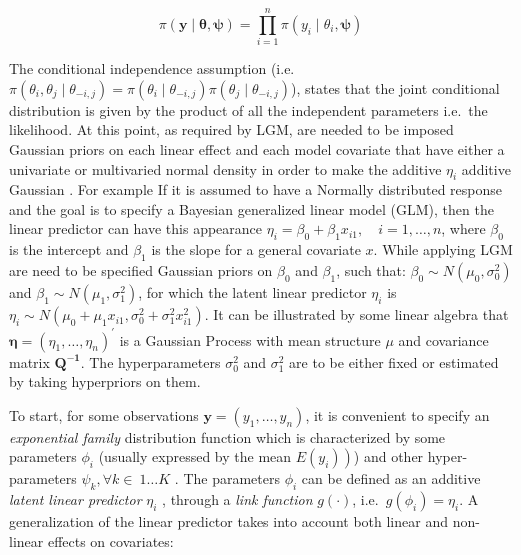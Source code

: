 \documentclass[
  12pt,
  a4paper,
  oneside]{book}
\theoremstyle{definition}
\theoremstyle{definition}
\theoremstyle{definition}
\theoremstyle{remark}
\begin{document}
\[
\pi(\boldsymbol{\mathbf{y}} \mid \boldsymbol{\theta}, \boldsymbol{\psi})=\prod_{i=1}^{n} \pi\left(y_{i} \mid \theta_{i}, \boldsymbol{\psi}\right)
\]

The conditional independence assumption \citep{GMRFRue} (i.e.~\(\pi\left(\theta_{i}, \theta_{j} \mid \theta_{-i, j}\right)=\pi\left(\theta_{i} \mid \theta_{-i, j}\right) \pi\left(\theta_{j} \mid \theta_{-i, j}\right)\)), states that the joint conditional distribution is given by the product of all the independent parameters i.e.~the likelihood.
At this point, as required by LGM, are needed to be imposed Gaussian priors on each linear effect and each model covariate that have either a univariate or multivaried normal density in order to make the additive \(\eta_i\) additive Gaussian \citeyearpar{wang2018bayesian}.
For example If it is assumed to have a Normally distributed response and the goal is to specify a Bayesian generalized linear model (GLM), then the linear predictor can have this appearance \(\eta_{i}=\beta_{0}+\beta_{1} x_{i 1}, \quad i=1, \ldots, n\), where \(\beta_{0}\) is the intercept and \(\beta_{1}\) is the slope for a general covariate \(x\). While applying LGM are need to be specified Gaussian priors on \(\beta_{0}\) and \(\beta_{1}\), such that: \(\beta_{0} \sim N\left(\mu_{0}, \sigma_{0}^{2}\right)\) and \(\beta_{1} \sim N\left(\mu_{1}, \sigma_{1}^{2}\right)\), for which the latent linear predictor \(\eta_i\) is \(\eta_{i} \sim N\left(\mu_{0}+\mu_{1} x_{i 1}, \sigma_{0}^{2}+\sigma_{1}^{2} x_{i 1}^{2}\right)\). It can be illustrated by some linear algebra \citeyearpar{wang2018bayesian} that \(\boldsymbol{\eta}=\left(\eta_{1}, \ldots, \eta_{n}\right)^{\prime}\) is a Gaussian Process with mean structure \(\mu\) and covariance matrix \(\boldsymbol{Q^{-1}}\). The hyperparameters \(\sigma_{0}^{2}\) and \(\sigma_{1}^{2}\) are to be either fixed or estimated by taking hyperpriors on them.

To start, for some observations \(\mathbf{y}=\left(y_{1}, \ldots, y_{n}\right)\), it is convenient to specify an \emph{exponential family} distribution function which is characterized by some parameters \(\phi_{i}\) (usually expressed by the mean \(\left.E\left(y_{i}\right)\right)\)) and other hyper-parameters \(\psi_{k} ,\forall k \in \ 1\ldots K\) \citeyearpar{Blangiarod-Cameletti}. The parameters \(\phi_{i}\) can be defined as an additive \emph{latent linear predictor} \(\eta_{i}\) \citep{Krainski-Rubio}, through a \emph{link function} \(g(\cdot)\), i.e.~\(g\left(\phi_{i}\right)=\eta_{i}\). A generalization of the linear predictor takes into account both linear and non-linear effects on covariates:
\end{document}

